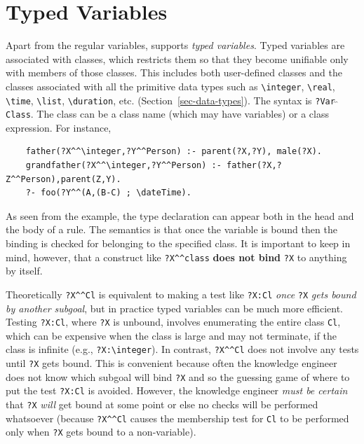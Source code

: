 \documentclass[11pt]{article}
\newcommand{\ERGO}{\mbox{\smaller{\ensuremath{\cal{E}}\smaller{{\sc{RGO}}}}}\xspace}
\newcommand{\FLSYSTEM}{\ERGO}
\newcommand{\bs}{\textbackslash}
\begin{document}
\section{Typed Variables} \label{sec-typedvars}

Apart from the regular variables, \FLSYSTEM supports \emph{typed variables}.
Typed variables are associated with classes, which restricts them so that
they become unifiable only with members of those classes. This
includes both user-defined classes and the classes associated with all the primitive data types such as 
\texttt{\bs{}integer}, \texttt{\bs{}real}, \texttt{\bs{}time},
\texttt{\bs{}list}, \texttt{\bs{}duration},
etc. (Section~\ref{sec-data-types}).
The syntax is \texttt{?Var$\hat{~}\hat{~}$Class}. The class can be a class
name (which may have variables) or a class expression. For instance,
\begin{verbatim}
    father(?X^^\integer,?Y^^Person) :- parent(?X,?Y), male(?X).
    grandfather(?X^^\integer,?Y^^Person) :- father(?X,?Z^^Person),parent(Z,Y).
    ?- foo(?Y^^(A,(B-C) ; \dateTime).
\end{verbatim}
As seen from the example, the type declaration can appear both in the head
and the body of a rule. The semantics is that once the variable is bound 
then the binding is checked for belonging to the specified
class. It is important to keep in mind, however, that a construct like
\verb|?X^^class| \textbf{does not bind} \texttt{?X} to anything by itself.   

Theoretically \verb|?X^^Cl| is equivalent to making a test like
\texttt{?X:Cl} \emph{once} \texttt{?X} \emph{gets bound by another subgoal},
but in practice typed variables can be much more efficient.
Testing \texttt{?X:Cl}, where \texttt{?X} is unbound,
involves enumerating the entire class
\texttt{Cl}, which can be expensive when the class is large and may not
terminate, if the class is infinite (e.g., \texttt{?X:\bs{}integer}). 
In contrast, \verb|?X^^Cl| does not involve any tests until \texttt{?X}
gets bound. This is convenient because often the knowledge engineer does
not know which subgoal will bind \texttt{?X} and so the guessing game
of where to put the test \texttt{?X:Cl} is avoided.
However, the knowledge engineer \emph{must be certain}    that \texttt{?X}
\emph{will} get bound at some point or else no checks will be performed whatsoever
(because \verb|?X^^Cl| causes the membership test for \texttt{Cl} to be
performed only when \texttt{?X} gets bound to a non-variable).    
\end{document}
